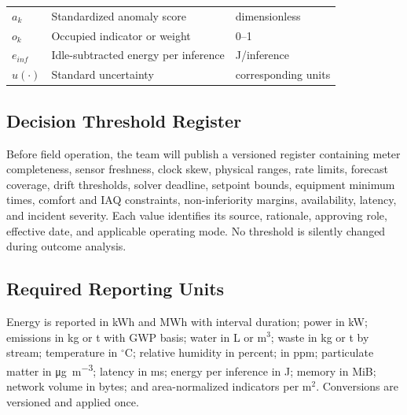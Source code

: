 \begin{table}[h]
\begin{tabularx}{\textwidth}{p{}p{}X}
		$a_k$                  & Standardized anomaly score                                & dimensionless       \\
		$o_k$                  & Occupied indicator or weight                              & 0--1                \\
		$e_{inf}$              & Idle-subtracted energy per inference                      & J/inference         \\
		$u(\cdot)$             & Standard uncertainty                                      & corresponding units \\
		\bottomrule
	\end{tabularx}
\end{table}

\subsection{Decision Threshold Register}

Before field operation, the team will publish a versioned register containing meter completeness, sensor freshness, clock skew, physical ranges, rate limits, forecast coverage, drift thresholds, solver deadline, setpoint bounds, equipment minimum times, comfort and IAQ constraints, non-inferiority margins, availability, latency, and incident severity. Each value identifies its source, rationale, approving role, effective date, and applicable operating mode. No threshold is silently changed during outcome analysis.

\subsection{Required Reporting Units}

Energy is reported in kWh and MWh with interval duration; power in kW; emissions in kg or t \COtwoe with GWP basis; water in L or m$^3$; waste in kg or t by stream; temperature in $^\circ$C; relative humidity in percent; \COtwo{} in ppm; particulate matter in \si{\micro\gram\per\cubic\meter}; latency in ms; energy per inference in J; memory in MiB; network volume in bytes; and area-normalized indicators per m$^2$. Conversions are versioned and applied once.
